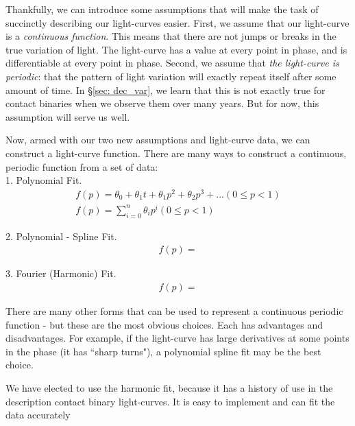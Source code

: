 \documentclass[12pt]{article} %
\numberwithin{equation}{section} %
\begin{document}
Thankfully, we can introduce some assumptions that will make the task of succinctly describing our light-curves easier. First, we assume that our light-curve is a \emph{continuous function}. This means that there are not jumps or breaks in the true variation of light. The light-curve has a value at every point in phase, and is differentiable at every point in phase. Second, we assume that \emph{the light-curve is periodic}: that the pattern of light variation will exactly repeat itself after some amount of time. In \S\ref{sec: dec_var}, we learn that this is not exactly true for contact binaries when we observe them over many years. But for now, this assumption will serve us well.

Now, armed with our two new assumptions and light-curve data, we can construct a light-curve function. There are many ways to construct a continuous, periodic function from a set of data: \\

1. Polynomial Fit. \\

\begin{multline} \label{eqn: polynomial_fit}
f(p) = \theta_{0} + \theta_{1}t + \theta_{1}p^{2} + \theta_{2}p^{3} + ... (0 \leq p < 1) \\
f(p) = \sum_{i = 0}^{n} \theta_{i}p^{i}  (0 \leq p < 1)
\end{multline}

2. Polynomial - Spline Fit. \\

\begin{multline} \label{eqn: spline_fit} 
f(p) = 
\end{multline}

3. Fourier (Harmonic) Fit. \\

\begin{multline} \label{eqn: harmonic_fit} 
f(p) = 
\end{multline}

There are many other forms that can be used to represent a continuous periodic function - but these are the most obvious choices. Each has advantages and disadvantages. For example, if the light-curve has large derivatives at some points in the phase (it has ``sharp turns"), a polynomial spline fit may be the best choice.

We have elected to use the harmonic fit, because it has a history of use in the description contact binary light-curves. It is easy to implement and can fit the data accurately
\end{document}

